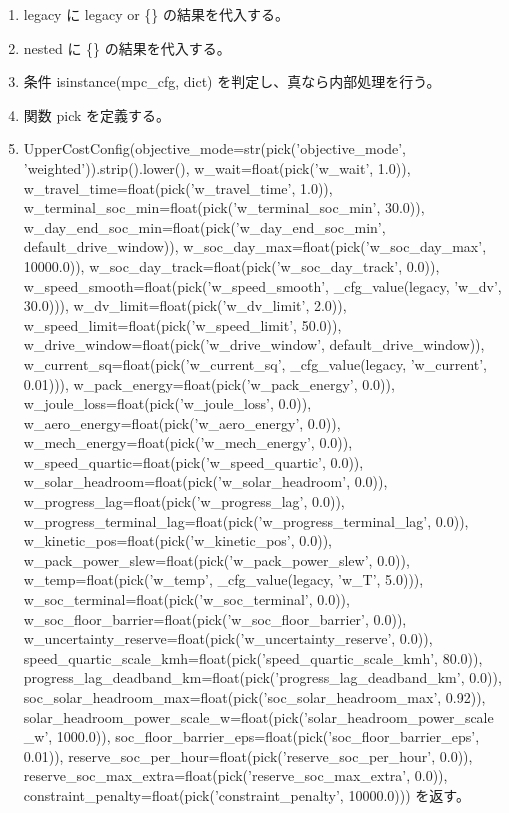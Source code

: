 \documentclass[a4paper,11pt]{article}
\begin{document}
            \begin{enumerate}[leftmargin=1.8em]
            \item legacy に legacy or \{\} の結果を代入する。
\item nested に \{\} の結果を代入する。
\item 条件 isinstance(mpc\_cfg, dict) を判定し、真なら内部処理を行う。
\item 関数 pick を定義する。
\item UpperCostConfig(objective\_mode=str(pick('objective\_mode', 'weighted')).strip().lower(), w\_wait=float(pick('w\_wait', 1.0)), w\_travel\_time=float(pick('w\_travel\_time', 1.0)), w\_terminal\_soc\_min=float(pick('w\_terminal\_soc\_min', 30.0)), w\_day\_end\_soc\_min=float(pick('w\_day\_end\_soc\_min', default\_drive\_window)), w\_soc\_day\_max=float(pick('w\_soc\_day\_max', 10000.0)), w\_soc\_day\_track=float(pick('w\_soc\_day\_track', 0.0)), w\_speed\_smooth=float(pick('w\_speed\_smooth', \_cfg\_value(legacy, 'w\_dv', 30.0))), w\_dv\_limit=float(pick('w\_dv\_limit', 2.0)), w\_speed\_limit=float(pick('w\_speed\_limit', 50.0)), w\_drive\_window=float(pick('w\_drive\_window', default\_drive\_window)), w\_current\_sq=float(pick('w\_current\_sq', \_cfg\_value(legacy, 'w\_current', 0.01))), w\_pack\_energy=float(pick('w\_pack\_energy', 0.0)), w\_joule\_loss=float(pick('w\_joule\_loss', 0.0)), w\_aero\_energy=float(pick('w\_aero\_energy', 0.0)), w\_mech\_energy=float(pick('w\_mech\_energy', 0.0)), w\_speed\_quartic=float(pick('w\_speed\_quartic', 0.0)), w\_solar\_headroom=float(pick('w\_solar\_headroom', 0.0)), w\_progress\_lag=float(pick('w\_progress\_lag', 0.0)), w\_progress\_terminal\_lag=float(pick('w\_progress\_terminal\_lag', 0.0)), w\_kinetic\_pos=float(pick('w\_kinetic\_pos', 0.0)), w\_pack\_power\_slew=float(pick('w\_pack\_power\_slew', 0.0)), w\_temp=float(pick('w\_temp', \_cfg\_value(legacy, 'w\_T', 5.0))), w\_soc\_terminal=float(pick('w\_soc\_terminal', 0.0)), w\_soc\_floor\_barrier=float(pick('w\_soc\_floor\_barrier', 0.0)), w\_uncertainty\_reserve=float(pick('w\_uncertainty\_reserve', 0.0)), speed\_quartic\_scale\_kmh=float(pick('speed\_quartic\_scale\_kmh', 80.0)), progress\_lag\_deadband\_km=float(pick('progress\_lag\_deadband\_km', 0.0)), soc\_solar\_headroom\_max=float(pick('soc\_solar\_headroom\_max', 0.92)), solar\_headroom\_power\_scale\_w=float(pick('solar\_headroom\_power\_scale\_w', 1000.0)), soc\_floor\_barrier\_eps=float(pick('soc\_floor\_barrier\_eps', 0.01)), reserve\_soc\_per\_hour=float(pick('reserve\_soc\_per\_hour', 0.0)), reserve\_soc\_max\_extra=float(pick('reserve\_soc\_max\_extra', 0.0)), constraint\_penalty=float(pick('constraint\_penalty', 10000.0))) を返す。
            \end{enumerate}
\end{document}
